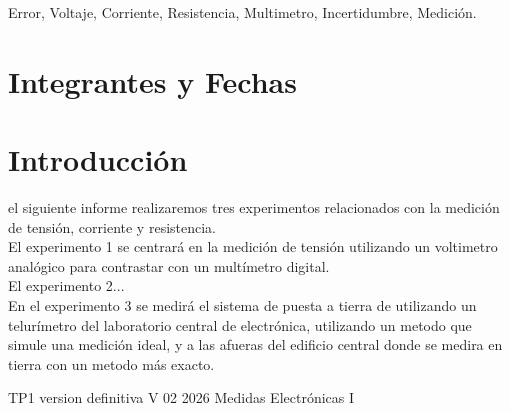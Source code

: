 \documentclass{plantilla}
\begin{document}
\maketitle

\begin{abstract}
En este informe se abordará el desarrollo y análisis del Trabajo Práctico de laboratorio Nro 1. En dicho TP buscaremos medir errores e inccertidumbres en mediciones de tensión, corriente y resistencia. 
\end{abstract}

\begin{IEEEkeywords}
Error, Voltaje, Corriente, Resistencia, Multimetro, Incertidumbre, Medición.
\end{IEEEkeywords}

\section{Integrantes y Fechas}

\begin{table}[H]
\end{table}

\section{Introducción}
 el siguiente informe realizaremos tres experimentos relacionados con la medición de tensión, corriente y resistencia. \\
El experimento 1 se centrará en la medición de tensión utilizando un voltimetro analógico para contrastar con un multímetro digital.\\
El experimento 2... \\
En el experimento 3 se medirá el sistema de puesta a tierra de utilizando un telurímetro del laboratorio central de electrónica, utilizando un metodo que simule una medición ideal, y a las afueras del edificio central donde se medira en tierra con un metodo más exacto.












\begin{thebibliography}{1}
TP1 version definitiva V 02 2026 Medidas Electrónicas I
\end{thebibliography}
\end{document}
